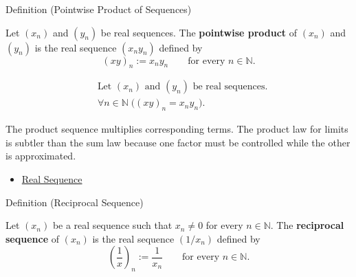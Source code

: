 
\begin{definitionbox}{Definition (Pointwise Product of Sequences)}
\begin{definition}
\label{def:pointwise-product-sequence}
Let $(x_n)$ and $(y_n)$ be real sequences. The \textbf{pointwise product}
of $(x_n)$ and $(y_n)$ is the real sequence $(x_ny_n)$ defined by
\[
(xy)_n := x_ny_n
\qquad
\text{for every } n\in\mathbb{N}.
\]
\end{definition}
\end{definitionbox}

\begin{remark*}
\[
\begin{aligned}
&\text{Let } (x_n) \text{ and } (y_n) \text{ be real sequences.}\\
&\forall n\in\mathbb{N}\;\bigl((xy)_n=x_ny_n\bigr).
\end{aligned}
\]
\end{remark*}

\begin{remark*}[Interpretation]
The product sequence multiplies corresponding terms. The product law for
limits is subtler than the sum law because one factor must be controlled while
the other is approximated.
\end{remark*}

\begin{dependencies}
\begin{itemize}
  \item \hyperref[def:real-sequence]{Real Sequence}
\end{itemize}
\end{dependencies}


\begin{definitionbox}{Definition (Reciprocal Sequence)}
\begin{definition}
\label{def:reciprocal-sequence}
Let $(x_n)$ be a real sequence such that $x_n\neq 0$ for every
$n\in\mathbb{N}$. The \textbf{reciprocal sequence} of $(x_n)$ is the real
sequence $(1/x_n)$ defined by
\[
\left(\frac{1}{x}\right)_n := \frac{1}{x_n}
\qquad
\text{for every } n\in\mathbb{N}.
\]
\end{definition}
\end{definitionbox}


